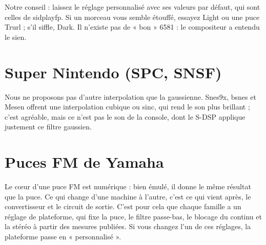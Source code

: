 Notre conseil : laissez le réglage personnalisé avec ses valeurs par défaut, qui sont celles de sidplayfp. Si un
morceau vous semble étouffé, essayez Light ou une puce Trurl ; s'il siffle, Dark. Il n'existe pas de « bon » 6581 :
le compositeur a entendu le sien.

\section{Super Nintendo (SPC, SNSF)}
\begin{reglages}
\end{reglages}
Nous ne proposons pas d'autre interpolation que la gaussienne. Snes9x, bsnes et Mesen offrent une interpolation
cubique ou sinc, qui rend le son plus brillant ; c'est agréable, mais ce n'est pas le son de la console, dont le
S-DSP applique justement ce filtre gaussien.

\section{Puces FM de Yamaha}
Le cœur d'une puce FM est numérique : bien émulé, il donne le même résultat que la puce. Ce qui change d'une machine
à l'autre, c'est ce qui vient après, le convertisseur et le circuit de sortie. C'est pour cela que chaque famille a
un réglage de plateforme, qui fixe la puce, le filtre passe-bas, le blocage du continu et la stéréo à partir des
mesures publiées. Si vous changez l'un de ces réglages, la plateforme passe en « personnalisé ».

